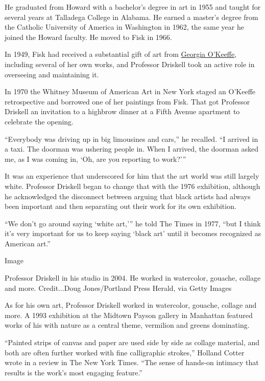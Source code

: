 He graduated from Howard with a bachelor's degree in art in 1955 and
taught for several years at Talladega College in Alabama. He earned a
master's degree from the Catholic University of America in Washington in
1962, the same year he joined the Howard faculty. He moved to Fisk in
1966.

In 1949, Fisk had received a substantial gift of art from
\href{https://www.nytimes3xbfgragh.onion/1986/03/07/obituaries/georgia-o-keeffe-dead-at-98-shaper-of-modern-art-in-us.html}{Georgia
O'Keeffe}, including several of her own works, and Professor Driskell
took an active role in overseeing and maintaining it.

In 1970 the Whitney Museum of American Art in New York staged an
O'Keeffe retrospective and borrowed one of her paintings from Fisk. That
got Professor Driskell an invitation to a highbrow dinner at a Fifth
Avenue apartment to celebrate the opening.

``Everybody was driving up in big limousines and cars,'' he recalled.
``I arrived in a taxi. The doorman was ushering people in. When I
arrived, the doorman asked me, as I was coming in, `Oh, are you
reporting to work?'''

It was an experience that underscored for him that the art world was
still largely white. Professor Driskell began to change that with the
1976 exhibition, although he acknowledged the disconnect between arguing
that black artists had always been important and then separating out
their work for its own exhibition.

``We don't go around saying `white art,''' he told The Times in 1977,
``but I think it's very important for us to keep saying `black art'
until it becomes recognized as American art.''

Image

Professor Driskell in his studio in 2004. He worked in watercolor,
gouache, collage and more. Credit...Doug Jones/Portland Press Herald,
via Getty Images

As for his own art, Professor Driskell worked in watercolor, gouache,
collage and more. A 1993 exhibition at the Midtown Payson gallery in
Manhattan featured works of his with nature as a central theme,
vermilion and greens dominating.

``Painted strips of canvas and paper are used side by side as collage
material, and both are often further worked with fine calligraphic
strokes,'' Holland Cotter wrote in a review in The New York Times. ``The
sense of hands-on intimacy that results is the work's most engaging
feature.''

